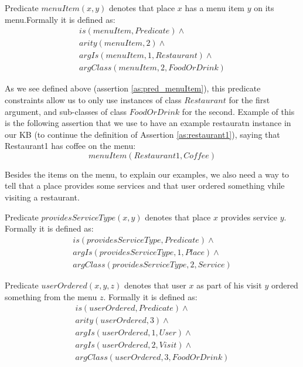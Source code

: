 \begin{definition}\label{def:menuItem}
Predicate $menuItem(x,y)$ denotes that place $x$ has a menu item $y$ on its 
menu.Formally it is defined as:
\begin{equation}\label{as:pred_menuItem}
\begin{gathered}
    is(menuItem,Predicate) \land \\
    arity(menuItem,2) \land \\
	argIs(menuItem,1,Restaurant) \land\\
	argClass(menuItem,2,FoodOrDrink)
\end{gathered}
\end{equation}
\end{definition}
As we see defined above (assertion \ref{as:pred_menuItem}), this predicate
constraints allow us to only use instances of class $Restaurant$ for the first
argument, and sub-classes of class $FoodOrDrink$ for the second. Example of this
is the following assertion that we use to have an example restauratn instance
in our KB (to continue the definition of Assertion \ref{as:restaurant1}), saying
that Restaurant1 has coffee on the menu:
\begin{equation}
menuItem(Restaurant1,Coffee)
\end{equation}

Besides the 
items on the menu, to explain our examples, we also need a way to tell that
a place provides some services and that user ordered something vhile visiting
a restaurant.

\begin{definition}\label{def:serviceType}
Predicate $providesServiceType(x,y)$ denotes that place $x$ provides service 
$y$. Formally it is defined as:
\begin{equation}\label{as:providesServiceType}
\begin{gathered}
    is(providesServiceType,Predicate) \land \\
	argIs(providesServiceType,1,Place) \land\\
	argClass(providesServiceType,2, Service)
\end{gathered}
\end{equation}
\end{definition}

\begin{definition}\label{def:userOrdered}
Predicate $userOrdered(x,y,z)$ denotes that user $x$ as part of his visit $y$ 
ordered something from the menu $z$. Formally it is defined as:
\begin{equation}\label{as:userOrdered}
\begin{gathered}
    is(userOrdered,Predicate) \land \\
    arity(userOrdered,3) \land \\
	argIs(userOrdered,1,User) \land\\
    argIs(userOrdered,2,Visit) \land \\
	argClass(userOrdered,3, FoodOrDrink)
\end{gathered}
\end{equation}
\end{definition}

